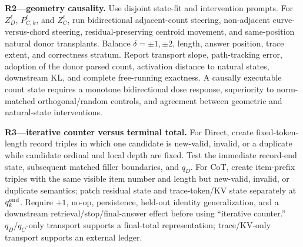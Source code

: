 \begin{todobox}
\textbf{R2---geometry causality.}
Use disjoint state-fit and intervention prompts. For \(Z_D^\ell\), \(P_{C,k}^\ell\), and \(Z_C^\ell\), run bidirectional adjacent-count steering, non-adjacent curve-versus-chord steering, residual-preserving centroid movement, and same-position natural donor transplants. Balance \(\delta=\pm1,\pm2\), length, answer position, trace extent, and correctness stratum. Report transport slope, path-tracking error, adoption of the donor parsed count, activation distance to natural states, downstream KL, and complete free-running exactness. A causally executable count state requires a monotone bidirectional dose response, superiority to norm-matched orthogonal/random controls, and agreement between geometric and natural-state interventions.
\end{todobox}

\begin{todobox}
\textbf{R3---iterative counter versus terminal total.}
For Direct, create fixed-token-length record triples in which one candidate is new-valid, invalid, or a duplicate while candidate ordinal and local depth are fixed. Test the immediate record-end state, subsequent matched filler boundaries, and \(q_D\). For CoT, create item-prefix triples with the same visible item number and length but new-valid, invalid, or duplicate semantics; patch residual state and trace-token/KV state separately at \(q_k^{\rm end}\). Require \(+1\), no-op, persistence, held-out identity generalization, and a downstream retrieval/stop/final-answer effect before using ``iterative counter.'' \(q_D/q_C\)-only transport supports a final-total representation; trace/KV-only transport supports an external ledger.
\end{todobox}
